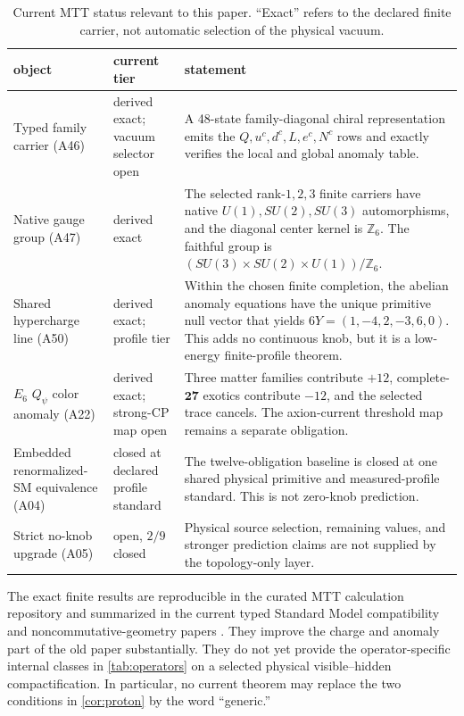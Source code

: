 \documentclass[11pt]{article}
\newcommand{\Z}{\mathbb{Z}}
\begin{document}
\begin{table}[ht]
\centering
\small
\caption{Current MTT status relevant to this paper. ``Exact'' refers to the
declared finite carrier, not automatic selection of the physical vacuum.}
\label{tab:mtt-status}
\begin{tabularx}{\textwidth}{@{}P{0.19\textwidth}P{0.18\textwidth}Y@{}}
\toprule
object & current tier & statement \\
\midrule
Typed family carrier (A46) &
derived exact; vacuum selector open &
A 48-state family-diagonal chiral representation emits the \(Q,u^c,d^c,
L,e^c,N^c\) rows and exactly verifies the local and global anomaly table.\\
\addlinespace
Native gauge group (A47) &
derived exact &
The selected rank-\(1,2,3\) finite carriers have native
\(U(1),SU(2),SU(3)\) automorphisms, and the diagonal center kernel is
\(\Z_6\). The faithful group is
\((SU(3)\times SU(2)\times U(1))/\Z_6\).\\
\addlinespace
Shared hypercharge line (A50) &
derived exact; profile tier &
Within the chosen finite completion, the abelian anomaly equations have the
unique primitive null vector that yields
\(6Y=(1,-4,2,-3,6,0)\). This adds no continuous knob, but it is a
low-energy finite-profile theorem.\\
\addlinespace
\(E_6\) \(Q_\psi\) color anomaly (A22) &
derived exact; strong-CP map open &
Three matter families contribute \(+12\), complete-\(\mathbf{27}\) exotics
contribute \(-12\), and the selected trace cancels. The axion-current
threshold map remains a separate obligation.\\
\addlinespace
Embedded renormalized-SM equivalence (A04) &
closed at declared profile standard &
The twelve-obligation baseline is closed at one shared physical primitive
and measured-profile standard. This is not zero-knob prediction.\\
\addlinespace
Strict no-knob upgrade (A05) &
open, \(2/9\) closed &
Physical source selection, remaining values, and stronger prediction
claims are not supplied by the topology-only layer.\\
\bottomrule
\end{tabularx}
\end{table}

The exact finite results are reproducible in the curated MTT calculation
repository \cite{MTTResults} and summarized in the current typed Standard
Model compatibility and noncommutative-geometry papers
\cite{MTTB4,MTTNCG}. They improve the charge and anomaly part of the old
paper substantially. They do not yet provide the operator-specific internal
classes in \cref{tab:operators} on a selected physical visible--hidden
compactification. In particular, no current theorem may replace the two
conditions in \cref{cor:proton} by the word ``generic.''
\end{document}
